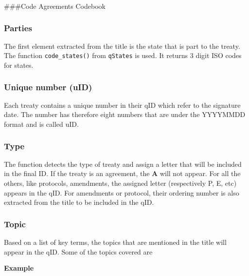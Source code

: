 \documentclass[
]{article}
\begin{document}
\#\#\#Code Agreements Codebook

\hypertarget{parties}{%
\subsubsection{Parties}\label{parties}}

The first element extracted from the title is the state that is part to
the treaty. The function \texttt{code\_states()} from \texttt{qStates}
is used. It returns 3 digit ISO codes for states.

\hypertarget{unique-number-uid}{%
\subsubsection{Unique number (uID)}\label{unique-number-uid}}

Each treaty contains a unique number in their qID which refer to the
signature date. The number has therefore eight numbers that are under
the YYYYMMDD format and is called uID.

\hypertarget{type}{%
\subsubsection{Type}\label{type}}

The function detects the type of treaty and assign a letter that will be
included in the final ID. If the treaty is an agreement, the \textbf{A}
will not appear. For all the others, like protocols, amendments, the
assigned letter (respectively P, E, etc) appears in the qID. For
amendments or protocol, their ordering number is also extracted from the
title to be included in the qID.

\hypertarget{topic}{%
\subsubsection{Topic}\label{topic}}

Based on a list of key terms, the topics that are mentioned in the title
will appear in the qID. Some of the topics covered are

\textbf{Example}
\end{document}
